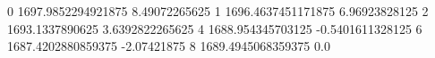 0 1697.9852294921875 8.49072265625
1 1696.4637451171875 6.96923828125
2 1693.1337890625 3.6392822265625
4 1688.954345703125 -0.5401611328125
6 1687.4202880859375 -2.07421875
8 1689.4945068359375 0.0
